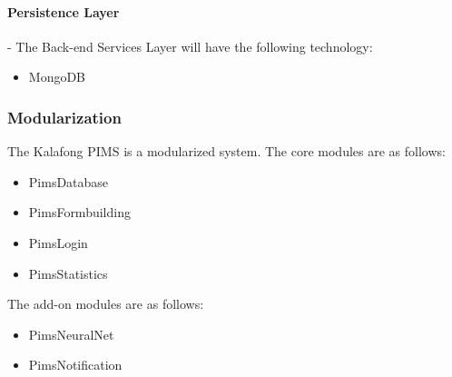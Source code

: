 \paragraph{Persistence Layer} -
The Back-end Services Layer will have the following technology:
\begin{itemize}
	\item MongoDB
\end{itemize}


\subsubsection{Modularization}
The Kalafong PIMS is a modularized system.
The core modules are as follows:
\begin{itemize}
	\item PimsDatabase
	\item PimsFormbuilding
	\item PimsLogin	
	\item PimsStatistics	
\end{itemize}
The add-on modules are as follows:
\begin{itemize}
	\item PimsNeuralNet
	\item PimsNotification	
\end{itemize}